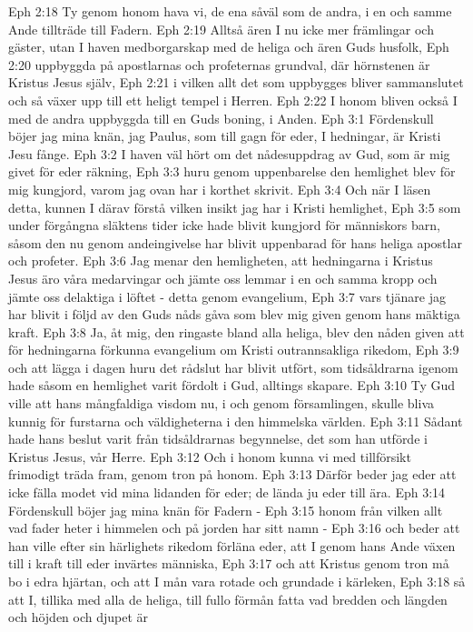 Eph 2:18  Ty genom honom hava vi, de ena såväl som de andra, i en och samme Ande tillträde till Fadern.
Eph 2:19  Alltså ären I nu icke mer främlingar och gäster, utan I haven medborgarskap med de heliga och ären Guds husfolk,
Eph 2:20  uppbyggda på apostlarnas och profeternas grundval, där hörnstenen är Kristus Jesus själv,
Eph 2:21  i vilken allt det som uppbygges bliver sammanslutet och så växer upp till ett heligt tempel i Herren.
Eph 2:22  I honom bliven också I med de andra uppbyggda till en Guds boning, i Anden.
Eph 3:1  Fördenskull böjer jag mina knän, jag Paulus, som till gagn för eder, I hedningar, är Kristi Jesu fånge.
Eph 3:2  I haven väl hört om det nådesuppdrag av Gud, som är mig givet för eder räkning,
Eph 3:3  huru genom uppenbarelse den hemlighet blev för mig kungjord, varom jag ovan har i korthet skrivit.
Eph 3:4  Och när I läsen detta, kunnen I därav förstå vilken insikt jag har i Kristi hemlighet,
Eph 3:5  som under förgångna släktens tider icke hade blivit kungjord för människors barn, såsom den nu genom andeingivelse har blivit uppenbarad för hans heliga apostlar och profeter.
Eph 3:6  Jag menar den hemligheten, att hedningarna i Kristus Jesus äro våra medarvingar och jämte oss lemmar i en och samma kropp och jämte oss delaktiga i löftet - detta genom evangelium,
Eph 3:7  vars tjänare jag har blivit i följd av den Guds nåds gåva som blev mig given genom hans mäktiga kraft.
Eph 3:8  Ja, åt mig, den ringaste bland alla heliga, blev den nåden given att för hedningarna förkunna evangelium om Kristi outrannsakliga rikedom,
Eph 3:9  och att lägga i dagen huru det rådslut har blivit utfört, som tidsåldrarna igenom hade såsom en hemlighet varit fördolt i Gud, alltings skapare.
Eph 3:10  Ty Gud ville att hans mångfaldiga visdom nu, i och genom församlingen, skulle bliva kunnig för furstarna och väldigheterna i den himmelska världen.
Eph 3:11  Sådant hade hans beslut varit från tidsåldrarnas begynnelse, det som han utförde i Kristus Jesus, vår Herre.
Eph 3:12  Och i honom kunna vi med tillförsikt frimodigt träda fram, genom tron på honom.
Eph 3:13  Därför beder jag eder att icke fälla modet vid mina lidanden för eder; de lända ju eder till ära.
Eph 3:14  Fördenskull böjer jag mina knän för Fadern -
Eph 3:15  honom från vilken allt vad fader heter i himmelen och på jorden har sitt namn -
Eph 3:16  och beder att han ville efter sin härlighets rikedom förläna eder, att I genom hans Ande växen till i kraft till eder invärtes människa,
Eph 3:17  och att Kristus genom tron må bo i edra hjärtan, och att I mån vara rotade och grundade i kärleken,
Eph 3:18  så att I, tillika med alla de heliga, till fullo förmån fatta vad bredden och längden och höjden och djupet är
